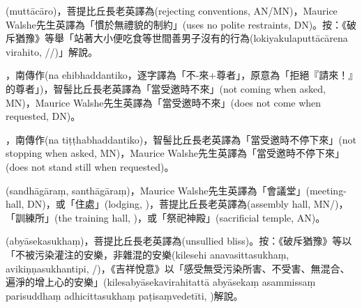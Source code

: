\startitemgroup[noteitems]
\item{}(muttācāro)，菩提比丘長老英譯為(rejecting conventions, AN/MN)，Maurice Walshe先生英譯為「慣於無禮貌的制約」(uses no polite restraints, DN)。按：《破斥猶豫》等舉「站著大小便吃食等世間善男子沒有的行為(lokiyakulaputtācārena virahito, //)」解說。
\stopitemgroup

\startitemgroup[noteitems]
\item{}，南傳作(na ehibhaddantiko，逐字譯為「不-來+尊者」，原意為「拒絕『請來！』的尊者」)，智髻比丘長老英譯為「當受邀時不來」(not coming when asked, MN)，Maurice Walshe先生英譯為「當受邀時不來」(does not come when requested, DN)。
\stopitemgroup

\startitemgroup[noteitems]
\item{}，南傳作(na tiṭṭhabhaddantiko)，智髻比丘長老英譯為「當受邀時不停下來」(not stopping when asked, MN)，Maurice Walshe先生英譯為「當受邀時不停下來」(does not stand still when requested)。
\stopitemgroup

\startitemgroup[noteitems]
\item{}(sandhāgāraṃ, santhāgāraṃ)，Maurice Walshe先生英譯為「會議堂」(meeting-hall, DN)，或「住處」(lodging, )，菩提比丘長老英譯為(assembly hall, MN/)，「訓練所」(the training hall, )，或「祭祀神殿」(sacrificial temple, AN)。
\stopitemgroup

\startitemgroup[noteitems]
\item{}(abyāsekasukhaṃ)，菩提比丘長老英譯為(unsullied bliss)。按：《破斥猶豫》等以「不被污染灌注的安樂，非雜混的安樂(kilesehi anavasittasukhaṃ, avikiṇṇasukhantipi, /)，《吉祥悅意》以「感受無受污染所害、不受害、無混合、遍淨的增上心的安樂」(kilesabyāsekavirahitattā  abyāsekaṃ asammissaṃ parisuddhaṃ adhicittasukhaṃ paṭisaṃvedetīti, )解說。
\stopitemgroup

